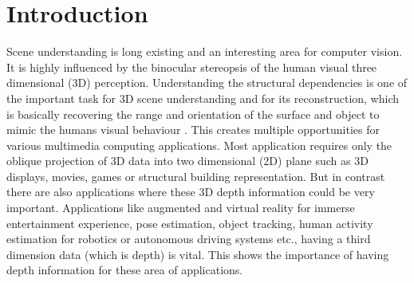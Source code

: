 
\chapter{Introduction} %

\label{Chapter1:introduction} %


\newcommand{\keyword}[1]{\textbf{#1}}
\newcommand{\tabhead}[1]{\textbf{#1}}
\newcommand{\code}[1]{\texttt{#1}}
\newcommand{\file}[1]{\texttt{\bfseries#1}}
\newcommand{\option}[1]{\texttt{\itshape#1}}




Scene understanding is long existing and an interesting area for computer vision. It is highly influenced by the binocular stereopsis of the human visual three dimensional (3D) perception. Understanding the structural dependencies is one of the important task for 3D scene understanding and for its reconstruction, which is basically recovering the range and orientation of the surface and object to mimic the humans visual behaviour \cite{barnard1982computational}. This creates multiple opportunities for various multimedia computing applications. Most application requires only the oblique projection of 3D data into two dimensional (2D) plane such as 3D displays, movies, games or structural building representation. But in contrast there are also applications where these 3D depth information could be very important. Applications like augmented and virtual reality for immerse entertainment experience, pose estimation, object tracking, human activity estimation for robotics or autonomous driving systems etc., having a third dimension data (which is depth) is vital. This shows the importance of having depth information for these area of applications. \\

